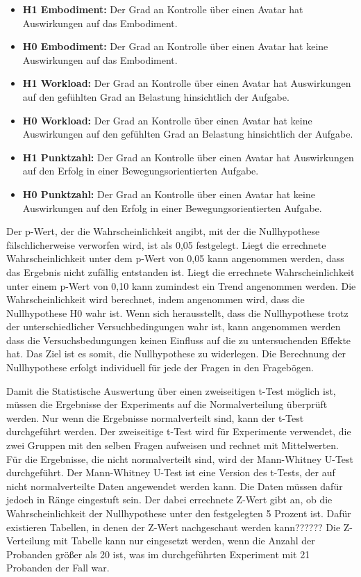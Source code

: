 \begin{itemize} 

\item \textbf{H1 Embodiment:} Der Grad an Kontrolle über einen Avatar hat Auswirkungen auf das Embodiment.
\item \textbf{H0 Embodiment:} Der Grad an Kontrolle über einen Avatar hat keine Auswirkungen auf das Embodiment.

\item \textbf{H1 Workload:} Der Grad an Kontrolle über einen Avatar hat Auswirkungen auf den gefühlten Grad an Belastung hinsichtlich der Aufgabe.
\item \textbf{H0 Workload:} Der Grad an Kontrolle über einen Avatar hat keine Auswirkungen auf den gefühlten Grad an Belastung hinsichtlich der Aufgabe.

\item \textbf{H1 Punktzahl:} Der Grad an Kontrolle über einen Avatar hat Auswirkungen auf den Erfolg in einer Bewegungsorientierten Aufgabe.
\item \textbf{H0 Punktzahl:} Der Grad an Kontrolle über einen Avatar hat keine Auswirkungen auf den Erfolg in einer Bewegungsorientierten Aufgabe.

\end{itemize}

Der p-Wert, der die Wahrscheinlichkeit angibt, mit der die Nullhypothese fälschlicherweise verworfen wird, ist als 0,05 festgelegt.
Liegt die errechnete Wahrscheinlichkeit unter dem p-Wert von 0,05 kann angenommen werden, dass das Ergebnis nicht zufällig entstanden ist. Liegt die errechnete Wahrscheinlichkeit unter einem p-Wert von 0,10 kann zumindest ein Trend angenommen werden.
Die Wahrscheinlichkeit wird berechnet, indem angenommen wird, dass die Nullhypothese H0 wahr ist. Wenn sich herausstellt, dass die Nullhypothese trotz der unterschiedlicher Versuchbedingungen wahr ist, kann angenommen werden dass die Versuchsbedungungen keinen Einfluss auf die zu untersuchenden Effekte hat. Das Ziel ist es somit, die Nullhypothese zu widerlegen.
Die Berechnung der Nullhypothese erfolgt individuell für jede der Fragen in den Fragebögen.

Damit die Statistische Auswertung über einen zweiseitigen t-Test möglich ist, müssen die Ergebnisse der Experiments auf die Normalverteilung überprüft werden. Nur wenn die Ergebnisse normalverteilt sind, kann der t-Test durchgeführt werden. Der zweiseitige t-Test wird für Experimente verwendet, die zwei Gruppen mit den selben Fragen aufweisen und rechnet mit Mittelwerten. Für die Ergebnisse, die nicht normalverteilt sind, wird der Mann-Whitney U-Test durchgeführt. Der Mann-Whitney U-Test ist eine Version des t-Tests, der auf nicht normalverteilte Daten angewendet werden kann. Die Daten müssen dafür jedoch in Ränge eingestuft sein. Der dabei errechnete Z-Wert gibt an, ob die Wahrscheinlichkeit der Nullhypothese unter den festgelegten 5 Prozent ist. Dafür existieren Tabellen, in denen der Z-Wert nachgeschaut werden kann?????? Die Z-Verteilung mit Tabelle kann nur eingesetzt werden, wenn die Anzahl der Probanden größer als 20 ist, was im durchgeführten Experiment mit 21 Probanden der Fall war.


